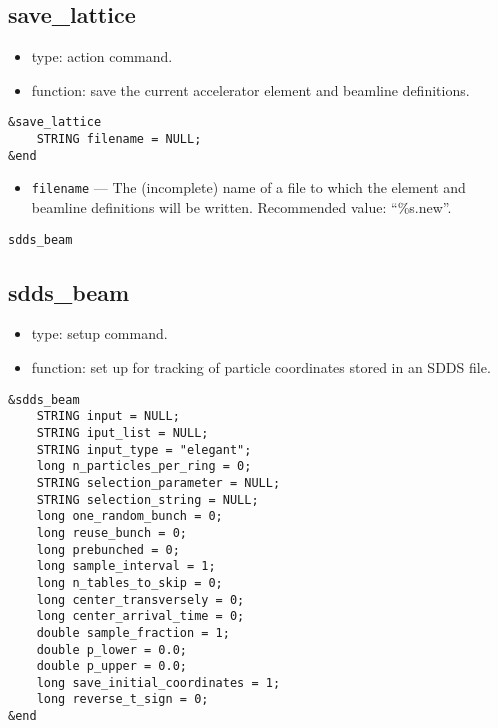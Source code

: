 \documentclass[11pt]{article}
\begin{document}
\subsection{save\_lattice}

\begin{itemize}
\item type: action command.
\item function: save the current accelerator element and beamline definitions.
\end{itemize}

\begin{verbatim}
&save_lattice
    STRING filename = NULL;
&end
\end{verbatim}

\begin{itemize}
\item \verb|filename| --- The (incomplete) name of a file to which the element and beamline definitions
will be written.  Recommended value: ``\%s.new''.
\end{itemize}

\begin{latexonly}
\newpage
\begin{center}{\Large\verb|sdds_beam|}\end{center}
\end{latexonly}
\subsection{sdds\_beam}

\begin{itemize}
\item type: setup command.
\item function: set up for tracking of particle coordinates stored in an SDDS file.
\end{itemize}

\begin{verbatim}
&sdds_beam
    STRING input = NULL;
    STRING iput_list = NULL;
    STRING input_type = "elegant";
    long n_particles_per_ring = 0;
    STRING selection_parameter = NULL;
    STRING selection_string = NULL;
    long one_random_bunch = 0;
    long reuse_bunch = 0;
    long prebunched = 0;
    long sample_interval = 1;
    long n_tables_to_skip = 0;
    long center_transversely = 0;
    long center_arrival_time = 0;
    double sample_fraction = 1;
    double p_lower = 0.0;
    double p_upper = 0.0;
    long save_initial_coordinates = 1;
    long reverse_t_sign = 0;
&end
\end{verbatim}
\end{document}
